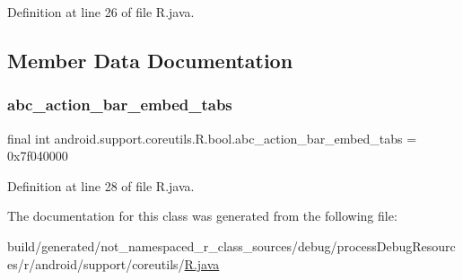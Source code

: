 Definition at line 26 of file R.\+java.


\begin{DoxyCode}{0}

\end{DoxyCode}


\subsection{Member Data Documentation}
\mbox{\label{classandroid_1_1support_1_1coreutils_1_1_r_1_1bool_a823fbd5acb99b42be3b1595abf7aeadb}} 
\subsubsection{\texorpdfstring{abc\_action\_bar\_embed\_tabs}{abc\_action\_bar\_embed\_tabs}}
{\footnotesize\ttfamily final int android.\+support.\+coreutils.\+R.\+bool.\+abc\+\_\+action\+\_\+bar\+\_\+embed\+\_\+tabs = 0x7f040000\hspace{0.3cm}{\ttfamily [static]}}



Definition at line 28 of file R.\+java.



The documentation for this class was generated from the following file\+:\begin{DoxyCompactItemize}
\item 
build/generated/not\+\_\+namespaced\+\_\+r\+\_\+class\+\_\+sources/debug/process\+Debug\+Resources/r/android/support/coreutils/\mbox{\hyperlink{android_2support_2coreutils_2_r_8java}{R.\+java}}\end{DoxyCompactItemize}
